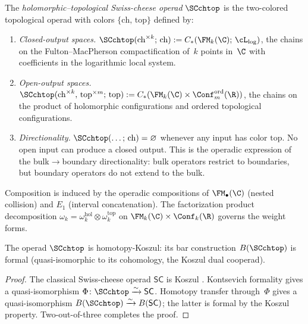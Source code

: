 \begin{definition}
\label{def:SC-chtop}
The \emph{holomorphic--topological Swiss-cheese operad}
$\SCchtop$ is the two-colored topological operad with
colors $\{\mathrm{ch},\, \mathrm{top}\}$ defined by:
\begin{enumerate}[label=\textup{(\alph*)}]
\item \emph{Closed-output spaces.}
 $\SCchtop(\mathrm{ch}^{\times k};\, \mathrm{ch})
 := C_*(\FM_k(\C);\, \cL_{\log})$,
 the chains on the Fulton--MacPherson compactification of~$k$
 points in~$\C$ with coefficients in the logarithmic local system.

\item \emph{Open-output spaces.}
 $\SCchtop(\mathrm{ch}^{\times k},\,
 \mathrm{top}^{\times m};\, \mathrm{top})
 := C_*(\FM_k(\C) \times \Conf_m^{\mathrm{ord}}(\R))$,
 the chains on the product of holomorphic configurations and
 ordered topological configurations.

\item \emph{Directionality.}
 $\SCchtop(\ldots;\, \mathrm{ch}) = \varnothing$ whenever any
 input has color $\mathrm{top}$. No open input can produce a
 closed output. This is the operadic expression of the
 bulk$\to$boundary directionality: bulk operators restrict to
 boundaries, but boundary operators do not extend to the bulk.
\end{enumerate}
Composition is induced by the operadic compositions of
$\FM_\bullet(\C)$ (nested collision) and $E_1$ (interval
concatenation). The factorization product decomposition
$\omega_k = \omega_k^{\mathrm{hol}} \otimes
\omega_k^{\mathrm{top}}$ on $\FM_k(\C) \times \Conf_k(\R)$
governs the weight forms.
\end{definition}

\begin{theorem}
\label{thm:homotopy-koszul-SC}
The operad $\SCchtop$ is homotopy-Koszul: its bar construction
$B(\SCchtop)$ is formal \textup{(}quasi-isomorphic to its
cohomology, the Koszul dual cooperad\textup{)}.
\end{theorem}

\begin{proof}
The classical Swiss-cheese operad $\mathsf{SC}$ is Koszul
\cite{Hoe09,HL12,GK94}. Kontsevich formality gives a quasi-isomorphism
$\Phi \colon \SCchtop \xrightarrow{\sim} \mathsf{SC}$.
Homotopy transfer through~$\Phi$ gives a quasi-isomorphism
$B(\SCchtop) \xrightarrow{\sim} B(\mathsf{SC})$; the latter is
formal by the Koszul property. Two-out-of-three completes the
proof.
\end{proof}

